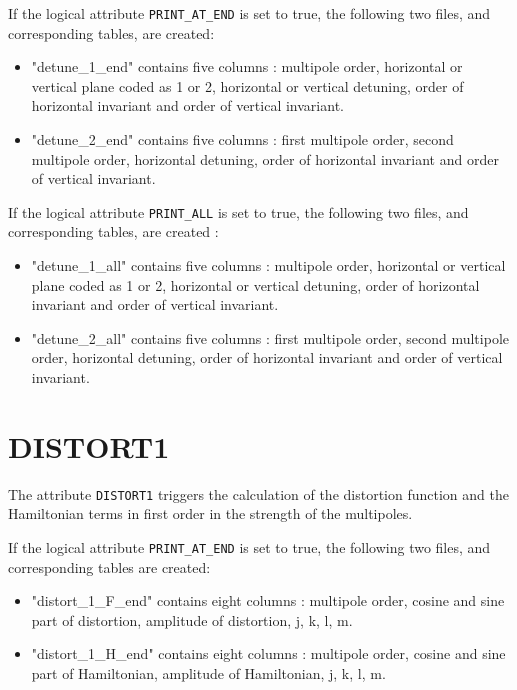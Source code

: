 If the logical attribute \texttt{PRINT\_AT\_END} is set to true,
the following two files, and corresponding tables, are created: 

\begin{itemize}
\item "detune\_1\_end" contains five columns :
multipole order, 
horizontal or vertical plane coded as 1 or 2,
horizontal or vertical detuning, 
order of horizontal invariant and 
order of vertical invariant. 

\item "detune\_2\_end" contains five columns : 
first multipole order, 
second multipole order,  
horizontal detuning, 
order of horizontal invariant and 
order of vertical invariant.  
\end{itemize}

If the logical attribute \texttt{PRINT\_ALL} is set to true, the
following two files, and corresponding tables, are created :   

\begin{itemize}
\item "detune\_1\_all" contains five columns :  
multipole order, 
horizontal or vertical plane coded as 1 or 2,  
horizontal or vertical detuning, 
order of horizontal invariant and 
order of vertical invariant. 

\item "detune\_2\_all" contains five columns :  
first multipole order, 
second multipole order,  
horizontal detuning, 
order of horizontal invariant and 
order of vertical invariant. 
\end{itemize}

\section{DISTORT1}

The attribute \texttt{DISTORT1} triggers the calculation of the
distortion function and the Hamiltonian terms in first order in the
strength of the multipoles.

If the logical attribute \texttt{PRINT\_AT\_END} is set to true,
the following two files, and corresponding tables are created:  

\begin{itemize}
\item "distort\_1\_F\_end" contains eight columns : 
multipole order, 
cosine and sine part of distortion, 
amplitude of distortion, 
j, k, l, m. 

\item "distort\_1\_H\_end"  contains eight columns : 
multipole order, 
cosine and sine part of Hamiltonian, 
amplitude of Hamiltonian, 
j, k, l, m.  
\end{itemize}


